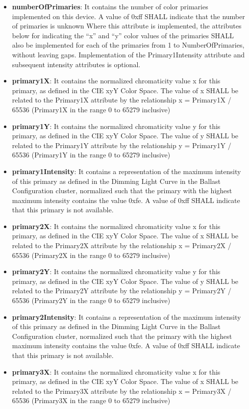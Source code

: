 \begin{itemize}
\item \textbf{numberOfPrimaries}: It contains the number of color primaries implemented on this device. A value of 0xff SHALL indicate that the number of primaries is unknown Where this attribute is implemented, the attributes below for indicating the “x” and “y” color values of the primaries SHALL also be implemented for each of the primaries from 1 to NumberOfPrimaries, without leaving gaps. Implementation of the Primary1Intensity attribute and subsequent intensity attributes is optional.
\item \textbf{primary1X}: It contains the normalized chromaticity value x for this primary, as defined in the CIE xyY Color Space. The value of x SHALL be related to the Primary1X attribute by the relationship x = Primary1X / 65536 (Primary1X in the range 0 to 65279 inclusive)
\item \textbf{primary1Y}: It contains the normalized chromaticity value y for this primary, as defined in the CIE xyY Color Space. The value of y SHALL be related to the Primary1Y attribute by the relationship y = Primary1Y / 65536 (Primary1Y in the range 0 to 65279 inclusive)
\item \textbf{primary1Intensity}: It contains a representation of the maximum intensity of this primary as defined in the Dimming Light Curve in the Ballast Configuration cluster, normalized such that the primary with the highest maximum intensity contains the value 0xfe. A value of 0xff SHALL indicate that this primary is not available.
\item \textbf{primary2X}: It contains the normalized chromaticity value x for this primary, as defined in the CIE xyY Color Space. The value of x SHALL be related to the Primary2X attribute by the relationship x = Primary2X / 65536 (Primary2X in the range 0 to 65279 inclusive)
\item \textbf{primary2Y}: It contains the normalized chromaticity value y for this primary, as defined in the CIE xyY Color Space. The value of y SHALL be related to the Primary2Y attribute by the relationship y = Primary2Y / 65536 (Primary2Y in the range 0 to 65279 inclusive)
\item \textbf{primary2Intensity}: It contains a representation of the maximum intensity of this primary as defined in the Dimming Light Curve in the Ballast Configuration cluster, normalized such that the primary with the highest maximum intensity contains the value 0xfe. A value of 0xff SHALL indicate that this primary is not available.
\item \textbf{primary3X}: It contains the normalized chromaticity value x for this primary, as defined in the CIE xyY Color Space. The value of x SHALL be related to the Primary3X attribute by the relationship x = Primary3X / 65536 (Primary3X in the range 0 to 65279 inclusive)

\end{itemize}
